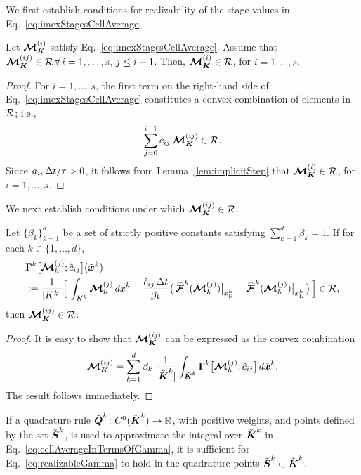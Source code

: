 We first establish conditions for realizability of the stage values in Eq.~\eqref{eq:imexStagesCellAverage}.  
\begin{lemma}
  Let $\boldsymbol{\mathcal{M}}_{\boldsymbol{K}}^{(i)}$ satisfy Eq.~\eqref{eq:imexStagesCellAverage}.
  Assume that $\boldsymbol{\mathcal{M}}_{\boldsymbol{K}}^{(ij)}\in\mathcal{R}\,\forall\,i=1,\ldots,s,\,j\le i-1$.  
  Then, $\boldsymbol{\mathcal{M}}_{\boldsymbol{K}}^{(i)}\in\mathcal{R}$, for $i=1,\ldots,s$.  
  \label{lem:imexStagesCellAverage}
\end{lemma}
\begin{proof}
  For $i=1,\ldots,s$, the first term on the right-hand side of Eq.~\eqref{eq:imexStagesCellAverage} constitutes a convex combination of elements in $\mathcal{R}$; i.e.,
  \begin{equation*}
    \sum_{j=0}^{i-1}c_{ij}\,\boldsymbol{\mathcal{M}}_{\boldsymbol{K}}^{(ij)}\in\mathcal{R}.
  \end{equation*}
  Since $a_{ii}\,\Delta t/\tau>0$, it follows from Lemma~\ref{lem:implicitStep} that $\boldsymbol{\mathcal{M}}_{\boldsymbol{K}}^{(i)}\in\mathcal{R}$, for $i=1,\ldots,s$.  
\end{proof}

We next establish conditions under which $\boldsymbol{\mathcal{M}}_{\boldsymbol{K}}^{(ij)}\in\mathcal{R}$.  
\begin{lemma}
  Let $\{\beta_{k}\}_{k=1}^{d}$ be a set of strictly positive constants satisfying $\sum_{k=1}^{d}\beta_{k}=1$.  
  If for each $k\in\{1,\ldots,d\}$, 
  \begin{align}
    &\boldsymbol{\Gamma}^{k}\big[\boldsymbol{\mathcal{M}}_{h}^{(j)};\hat{c}_{ij}\big](\tilde{\boldsymbol{x}}^{k}) \label{eq:realizableGamma} \\
    &:=\frac{1}{|K^{k}|}
    \Big[\,\int_{K^{k}}\boldsymbol{\mathcal{M}}_{h}^{(j)}\,dx^{k}-\frac{\hat{c}_{ij}\,\Delta t}{\beta_{k}}\big(\,\widehat{\boldsymbol{\mathcal{F}}}^{k}(\boldsymbol{\mathcal{M}}_{h}^{(j)})\big|_{x_{{\rm H}}^{k}}-\widehat{\boldsymbol{\mathcal{F}}}^{k}(\boldsymbol{\mathcal{M}}_{h}^{(j)})\big|_{x_{{\rm L}}^{k}}\,\big)\,\Big]\in\mathcal{R}, \nonumber    
  \end{align}
  then $\boldsymbol{\mathcal{M}}_{\boldsymbol{K}}^{(ij)}\in\mathcal{R}$.  
  \label{lem:realizableMij}
\end{lemma}
\begin{proof}
  It is easy to show that $\boldsymbol{\mathcal{M}}_{\boldsymbol{K}}^{(ij)}$ can be expressed as the convex combination
  \begin{equation}
    \boldsymbol{\mathcal{M}}_{\boldsymbol{K}}^{(ij)}
    =\sum_{k=1}^{d}\beta_{k}\,\frac{1}{|\tilde{\boldsymbol{\boldsymbol{K}}}^{k}|}\int_{\tilde{\boldsymbol{K}}^{k}}\boldsymbol{\Gamma}^{k}\big[\boldsymbol{\mathcal{M}}_{h}^{(j)};\hat{c}_{ij}\big]\,d\tilde{\boldsymbol{x}}^{k}.  
    \label{eq:cellAverageInTermsOfGamma}
  \end{equation}
  The result follows immediately.  
\end{proof}
\begin{rem}
  If a quadrature rule $\tilde{\boldsymbol{Q}}^{k}\colon C^{0}(\tilde{\boldsymbol{K}}^{k})\to\mathbb{R}$, with positive weights, and points defined by the set $\tilde{\boldsymbol{S}}^{k}$, is used to approximate the integral over $\tilde{\boldsymbol{K}}^{k}$ in Eq.~\eqref{eq:cellAverageInTermsOfGamma}, it is sufficient for Eq.~\eqref{eq:realizableGamma} to hold in the quadrature points $\tilde{\boldsymbol{S}}^{k}\subset\tilde{\boldsymbol{K}}^{k}$.  
\end{rem}

